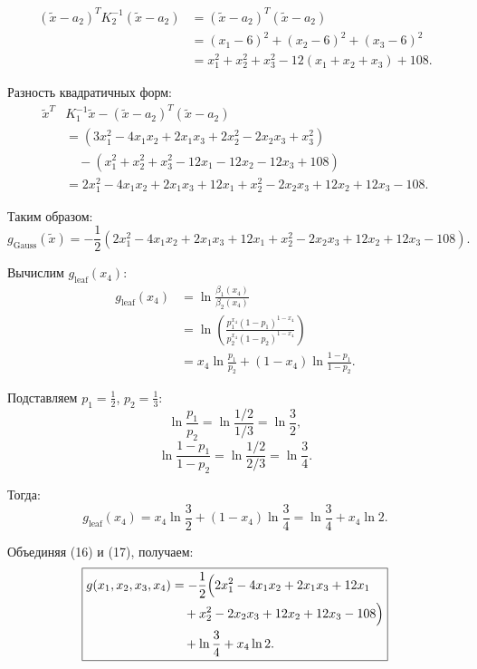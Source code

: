 \documentclass[pract]{SCWorks}
\begin{document}
    \[
    \begin{aligned}
    (\tilde{x} - a_2)^T K_2^{-1} (\tilde{x} - a_2) &=
    (\tilde{x} - a_2)^T (\tilde{x} - a_2) \\
    &= (x_1 - 6)^2 + (x_2 - 6)^2 + (x_3 - 6)^2 \\
    &= x_1^2 + x_2^2 + x_3^2 - 12(x_1 + x_2 + x_3) + 108.
    \end{aligned}
    \]

    Разность квадратичных форм:
    \[
    \begin{aligned}
    \tilde{x}^T &K_1^{-1} \tilde{x} - (\tilde{x} - a_2)^T (\tilde{x} - a_2) \\
    &= (3x_1^2 - 4x_1x_2 + 2x_1x_3 + 2x_2^2 - 2x_2x_3 + x_3^2) \\
    &\quad - (x_1^2 + x_2^2 + x_3^2 - 12x_1 - 12x_2 - 12x_3 + 108) \\
    &= 2x_1^2 - 4x_1x_2 + 2x_1x_3 + 12x_1 + x_2^2 - 2x_2x_3 + 12x_2 + 12x_3 - 108.
    \end{aligned}
    \]

    Таким образом:
    \begin{equation}
    g_{\text{Gauss}}(\tilde{x}) =
    -\frac{1}{2} \left( 2x_1^2 - 4x_1x_2 + 2x_1x_3 + 12x_1 + x_2^2 - 2x_2x_3 + 12x_2 + 12x_3 - 108 \right).
    \end{equation}

    Вычислим $g_{\text{leaf}}(x_4)$:
    \[
    \begin{aligned}
    g_{\text{leaf}}(x_4) &= \ln\frac{\beta_1(x_4)}{\beta_2(x_4)} \\
    &= \ln\left( \frac{p_1^{x_4} (1-p_1)^{1-x_4}}{p_2^{x_4} (1-p_2)^{1-x_4}} \right) \\
    &= x_4 \ln\frac{p_1}{p_2} + (1 - x_4) \ln\frac{1-p_1}{1-p_2}.
    \end{aligned}
    \]

    Подставляем $p_1 = \frac{1}{2}$, $p_2 = \frac{1}{3}$:
    \[
    \ln\frac{p_1}{p_2} = \ln\frac{1/2}{1/3} = \ln\frac{3}{2},
    \]
    \[
    \ln\frac{1-p_1}{1-p_2} = \ln\frac{1/2}{2/3} = \ln\frac{3}{4}.
    \]

    Тогда:
    \begin{equation}
    g_{\text{leaf}}(x_4) = x_4 \ln\frac{3}{2} + (1 - x_4) \ln\frac{3}{4}
    = \ln\frac{3}{4} + x_4 \ln 2.
    \end{equation}

    Объединяя (16) и (17), получаем:
    \begin{equation}
    \boxed{
    \begin{aligned}
    g(x_1, x_2, x_3, x_4) &=
    -\frac{1}{2} \Bigl( 2x_1^2 - 4x_1x_2 + 2x_1x_3 + 12x_1 \\
    &\quad + x_2^2 - 2x_2x_3 + 12x_2 + 12x_3 - 108 \Bigr) \\
    &\quad + \ln\frac{3}{4} + x_4 \ln 2.
    \end{aligned}
    }
    \end{equation}
\end{document}
